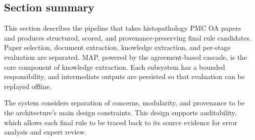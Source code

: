 \subsection{Section summary}\label{subsec:overview-section-summary}

This section describes the pipeline that takes histopathology PMC OA papers and produces structured, scored, and provenance-preserving final rule candidates. Paper selection, document extraction, knowledge extraction, and per-stage evaluation are separated. MAP, powered by the agreement-based cascade, is the core component of knowledge extraction. Each subsystem has a bounded responsibility, and intermediate outputs are persisted so that evaluation can be replayed offline. 

The system considers separation of concerns, modularity, and provenance to be the architecture's main design constraints. This design supports auditability, which allows each final rule to be traced back to its source evidence for error analysis and expert review.